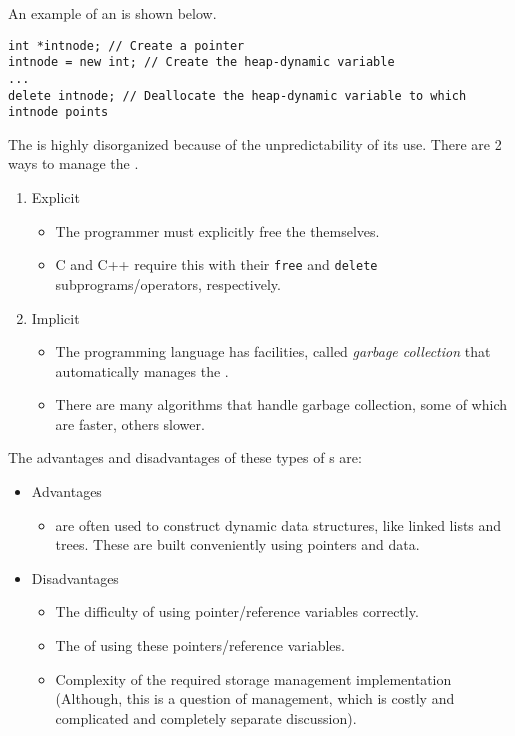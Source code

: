 An example of an  is shown below.
\begin{verbatim}
int *intnode; // Create a pointer
intnode = new int; // Create the heap-dynamic variable
...
delete intnode; // Deallocate the heap-dynamic variable to which intnode points
\end{verbatim}

The  is highly disorganized because of the unpredictability of its use.
There are 2 ways to manage the .
\begin{enumerate}[noitemsep]
\item Explicit 
  \begin{itemize}[noitemsep]
  \item The programmer must explicitly free the  themselves.
  \item C and C++ require this with their \texttt{free} and \texttt{delete} subprograms/operators, respectively.
  \end{itemize}
\item Implicit 
  \begin{itemize}[noitemsep]
  \item The programming language has facilities, called \emph{garbage collection} that automatically manages the .
  \item There are many algorithms that handle garbage collection, some of which are faster, others slower.
  \end{itemize}
\end{enumerate}

The advantages and disadvantages of these types of s are:
\begin{itemize}[noitemsep]
\item Advantages
  \begin{itemize}[noitemsep]
  \item {} are often used to construct dynamic data structures, like linked lists and trees. These are built conveniently using pointers and data.
  \end{itemize}
\item Disadvantages
  \begin{itemize}[noitemsep]
  \item The difficulty of using pointer/reference variables correctly.
  \item The  of using these pointers/reference variables.
  \item Complexity of the required storage management implementation (Although, this is a question of  management, which is costly and complicated and completely separate discussion).
  \end{itemize}
\end{itemize}

